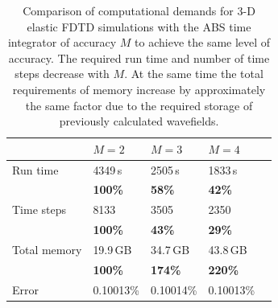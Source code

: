 \documentclass[11pt,onecolumn,oneside]{article}
\begin{document}
\begin{table}[hb]
  \begin{center}
    \begin{tabular}{l|l|l|ll}
          & $M=2$  & $M=3$   & $M=4$      &   \\\hline
    Run time & 4349\,s & 2505\,s & 1833\,s & \\
          & \textbf{100\%}   &\textbf{58\%}  & \textbf{42\%}   & \\\hline
    Time steps & 8133 & 3505 & 2350 & \\
          & \textbf{100\%}   &\textbf{43\%}  & \textbf{29\%}   & \\\hline
    Total memory & 19.9\,GB  &  34.7\,GB& 43.8\,GB  &  \\
          & \textbf{100\%}   & \textbf{174\%} &\textbf{220\%} & \\\hline
    Error & 0.10013\% &0.10014\% & 0.10013\% & \\
    \end{tabular}
   \end{center}
   \caption{\label{tab:3D_times} Comparison of computational demands for 3-D elastic FDTD simulations with the ABS time integrator of accuracy $M$ to achieve the same level of accuracy. The required run time and number of time steps
   decrease with $M$. At the same time the total requirements of memory increase by approximately the same factor due to the required storage of previously calculated wavefields. }
\end{table}
\end{document}
